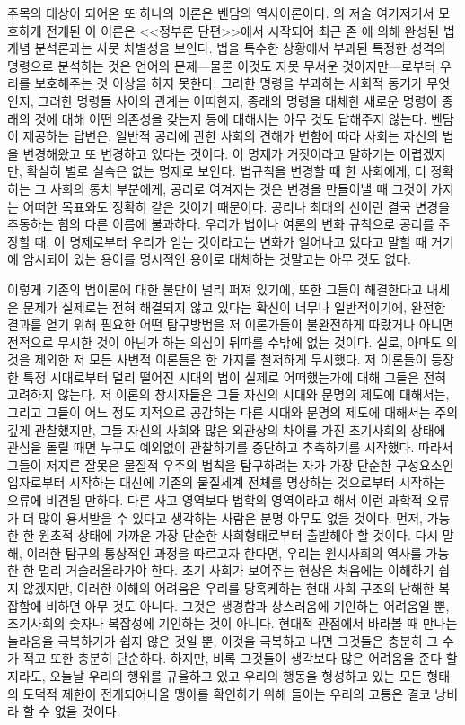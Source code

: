 주목의 대상이 되어온 또 하나의 이론은 벤담의 역사이론이다.
의 저술 여기저기서 모호하게 
전개된 이 이론은 <<정부론 단편>>에서 시작되어 최근 존 에 의해 완성된
법개념 분석론과는 사뭇 차별성을 보인다.
법을 특수한 상황에서 부과된 특정한 성격의 명령으로 분석하는 것은
언어의 문제---물론 이것도 자못 무서운 것이지만---로부터 우리를 보호해주는 것
이상을 하지 못한다.
그러한 명령을 부과하는 사회적 동기가 무엇인지,
그러한 명령들 사이의 관계는 어떠한지,
종래의 명령을 대체한 새로운 명령이 종래의 것에 대해
어떤 의존성을 갖는지 등에 대해서는
아무 것도 답해주지 않는다.
벤담이 제공하는 답변은,
일반적 공리에 관한 사회의 견해가 변함에 따라
사회는 자신의 법을 변경해왔고 또 변경하고 있다는 것이다.
이 명제가 거짓이라고 말하기는 어렵겠지만,
확실히 별로 실속은 없는 명제로 보인다.
법규칙을 변경할 때 한 사회에게, 더 정확히는 그 사회의 통치 부분에게,
공리로 여겨지는 것은 변경을 만들어낼 때 그것이 가지는 어떠한 목표와도
정확히 같은 것이기 때문이다.
공리나 최대의 선이란 결국 변경을 추동하는 힘의 다른 이름에 불과하다.
우리가 법이나 여론의 변화 규칙으로 공리를 주장할 때,
이 명제로부터 우리가 얻는 것이라고는
변화가 일어나고 있다고 말할 때 거기에 암시되어 있는 용어를
명시적인 용어로 대체하는 것말고는 아무 것도 없다.

이렇게 기존의 법이론에 대한 불만이 널리 퍼져 있기에,
또한 그들이 해결한다고 내세운 문제가 실제로는 전혀 해결되지 않고 있다는
확신이 너무나 일반적이기에,
완전한 결과를 얻기 위해 필요한 어떤 탐구방법을 저 이론가들이
불완전하게 따랐거나 아니면 전적으로 무시한 것이 아닌가 하는 의심이
뒤따를 수밖에 없는 것이다.
실로, 아마도 의 것을 제외한 저 모든 사변적 이론들은
한 가지를 철저하게 무시했다.
저 이론들이 등장한 특정 시대로부터 멀리 떨어진 시대의 법이 실제로
어떠했는가에 대해 그들은 전혀 고려하지 않는다.
저 이론의 창시자들은 그들 자신의 시대와 문명의 제도에 대해서는,
그리고 그들이 어느 정도 지적으로 공감하는 다른 시대와 문명의 제도에 대해서는
주의 깊게 관찰했지만,
그들 자신의 사회와 많은 외관상의 차이를 가진 초기사회의 상태에
관심을 돌릴 때면 누구도 예외없이 관찰하기를 중단하고 추측하기를 시작했다.
따라서 그들이 저지른 잘못은 물질적 우주의 법칙을 탐구하려는 자가
가장 단순한 구성요소인 입자로부터 시작하는 대신에
기존의 물질세계 전체를 명상하는 것으로부터 시작하는 오류에 비견될 만하다.
다른 사고 영역보다 법학의 영역이라고 해서 이런 과학적 오류가 더 많이
용서받을 수 있다고 생각하는 사람은 분명 아무도 없을 것이다.
먼저, 가능한 한 원초적 상태에 가까운 가장 단순한 사회형태로부터
출발해야 할 것이다.
다시 말해, 이러한 탐구의 통상적인 과정을 따르고자 한다면,
우리는 원시사회의 역사를 가능한 한 멀리 거슬러올라가야 한다.
초기 사회가 보여주는 현상은 처음에는 이해하기 쉽지 않겠지만,
이러한 이해의 어려움은 우리를 당혹케하는 현대 사회 구조의
난해한 복잡함에 비하면 아무 것도 아니다.
그것은 생경함과 상스러움에 기인하는 어려움일 뿐,
초기사회의 숫자나 복잡성에 기인하는 것이 아니다.
현대적 관점에서 바라볼 때 만나는 놀라움을 극복하기가
쉽지 않은 것일 뿐, 이것을 극복하고 나면 그것들은 충분히 그 수가 적고
또한 충분히 단순하다.
하지만, 비록 그것들이 생각보다 많은 어려움을 준다 할지라도,
오늘날 우리의 행위를 규율하고 있고 우리의 행동을 형성하고 있는
모든 형태의 도덕적 제한이 전개되어나올 맹아를 확인하기 위해 들이는
우리의 고통은 결코 낭비라 할 수 없을 것이다.

